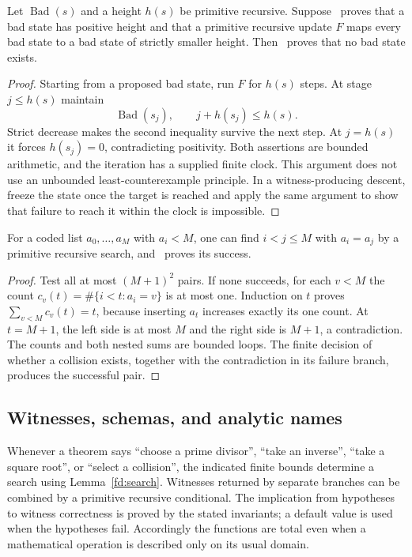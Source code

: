 \begin{lemma}\label{fd:descent}
Let $\operatorname{Bad}(s)$ and a height $h(s)$ be primitive recursive. Suppose \ipra\ proves that a bad state has positive height and that a primitive recursive update $F$ maps every bad state to a bad state of strictly smaller height. Then \ipra\ proves that no bad state exists.
\end{lemma}
\begin{proof}
Starting from a proposed bad state, run $F$ for $h(s)$ steps. At stage $j\le h(s)$ maintain
\[
 \operatorname{Bad}(s_j),\qquad j+h(s_j)\le h(s).
\]
Strict decrease makes the second inequality survive the next step. At $j=h(s)$ it forces $h(s_j)=0$, contradicting positivity. Both assertions are bounded arithmetic, and the iteration has a supplied finite clock. This argument does not use an unbounded least-counterexample principle. In a witness-producing descent, freeze the state once the target is reached and apply the same argument to show that failure to reach it within the clock is impossible.
\end{proof}

\begin{lemma}\label{fd:php}
For a coded list $a_0,\ldots,a_M$ with $a_i<M$, one can find $i<j\le M$ with $a_i=a_j$ by a primitive recursive search, and \ipra\ proves its success.
\end{lemma}
\begin{proof}
Test all at most $(M+1)^2$ pairs. If none succeeds, for each $v<M$ the count $c_v(t)=\#\{i<t:a_i=v\}$ is at most one. Induction on $t$ proves $\sum_{v<M}c_v(t)=t$, because inserting $a_t$ increases exactly its one count. At $t=M+1$, the left side is at most $M$ and the right side is $M+1$, a contradiction. The counts and both nested sums are bounded loops. The finite decision of whether a collision exists, together with the contradiction in its failure branch, produces the successful pair.
\end{proof}

\subsection{Witnesses, schemas, and analytic names}
Whenever a theorem says ``choose a prime divisor'', ``take an inverse'', ``take a square root'', or ``select a collision'', the indicated finite bounds determine a search using Lemma~\ref{fd:search}. Witnesses returned by separate branches can be combined by a primitive recursive conditional. The implication from hypotheses to witness correctness is proved by the stated invariants; a default value is used when the hypotheses fail. Accordingly the functions are total even when a mathematical operation is described only on its usual domain.


